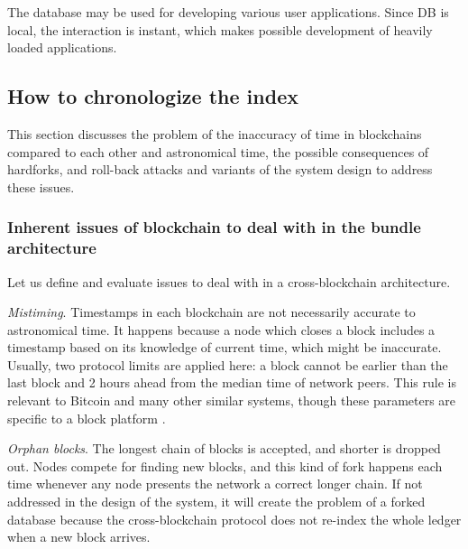 \begin{multicols}{2}
The database may be used for developing various user applications. Since DB is local, the interaction is instant, which makes possible development of heavily loaded applications.

\subsection{How to chronologize the index}\label{subsec-4.3}

\vspace{-.2cm}

This section discusses the problem of the inaccuracy of time in blockchains compared to each other and astronomical time, the possible consequences of hardforks, and roll-back attacks and variants of the system design to address these issues.

\vspace{-.6cm}

\subsubsection{Inherent issues of blockchain to deal with in the bundle architecture}\label{subsubsec-4.3.a}

Let us define and evaluate issues to deal with in a cross-blockchain architecture.

\textit{Mistiming}. Timestamps in each blockchain are not necessarily accurate to astronomical time. It happens because a node which closes a block includes a timestamp based on its knowledge of current time, which might be inaccurate. Usually, two protocol limits are applied here: a block cannot be earlier than the last block and 2 hours ahead from the median time of network peers. This rule is relevant to Bitcoin and many other similar systems, though these parameters are specific to a block platform \cite{art1-key39}. 

\textit{Orphan blocks}. The longest chain of blocks is accepted, and shorter is dropped out. Nodes compete for finding new blocks, and this kind of fork happens each time whenever any node presents the network a correct longer chain. If not addressed in the design of the system, it will create the problem of a forked database because the cross-blockchain protocol does not re-index the whole ledger when a new block arrives.


\end{multicols}
